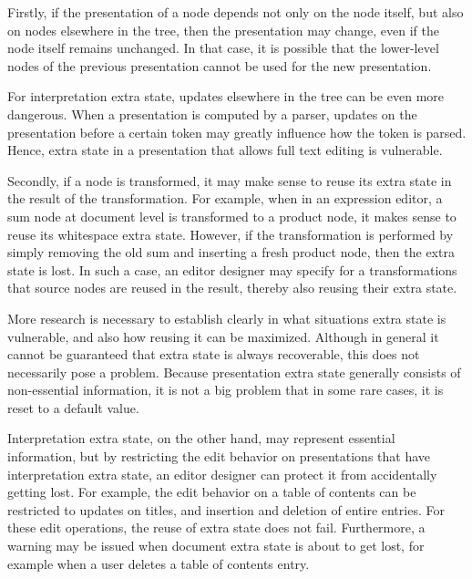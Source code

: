 Firstly, if the presentation of a node depends not only on the node itself, but also on nodes elsewhere in the tree, then the presentation may change, even if the node itself remains unchanged. In that case, it is possible that the lower-level nodes of the previous presentation cannot be used for the new presentation. %

For interpretation extra state, updates elsewhere in the tree can be  even more dangerous. When a presentation is computed by a parser, updates on the presentation before a certain token may greatly influence how the token is parsed. Hence, extra state in a presentation that allows full text editing is vulnerable. 


Secondly, if a node is transformed, it may make sense to reuse its extra state in the result of the transformation. For example, when in an expression editor, a sum node at document level is transformed to a product node, it makes sense to reuse its whitespace extra state. However, if the transformation is performed by simply removing the old sum and inserting a fresh product node, then the extra state is lost. In such a case, an editor designer may specify for a transformations that source nodes are reused in the result, thereby also reusing their extra state. 

More research is necessary to establish clearly in what situations extra state is vulnerable, and also how reusing it can be maximized. Although in general it cannot be guaranteed that extra state is always recoverable, this does not necessarily pose a problem. Because presentation extra state generally consists of non-essential information, it is not a big problem that in some rare cases, it is reset to a default value.

Interpretation extra state, on the other hand, may represent essential information, but by restricting the edit behavior on presentations that have interpretation extra state, an editor designer can protect it from accidentally getting lost. For example, the edit behavior on a table of contents can be restricted to updates on titles, and insertion and deletion of entire entries. For these edit operations, the reuse of extra state does not fail. Furthermore, a warning may be issued when document extra state is about to get lost, for example when a user deletes a table of contents entry.

